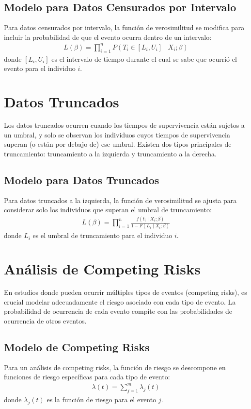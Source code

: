 \documentclass[a4paper]{report} %
\begin{document}
\subsection{Modelo para Datos Censurados por Intervalo}
Para datos censurados por intervalo, la funci\'on de verosimilitud se modifica para incluir la probabilidad de que el evento ocurra dentro de un intervalo:
\begin{eqnarray*}
L(\beta) = \prod_{i=1}^n P(T_i \in [L_i, U_i] \mid X_i; \beta)
\end{eqnarray*}
donde $[L_i, U_i]$ es el intervalo de tiempo durante el cual se sabe que ocurri\'o el evento para el individuo $i$.

\section{Datos Truncados}
Los datos truncados ocurren cuando los tiempos de supervivencia est\'an sujetos a un umbral, y solo se observan los individuos cuyos tiempos de supervivencia superan (o est\'an por debajo de) ese umbral. Existen dos tipos principales de truncamiento: truncamiento a la izquierda y truncamiento a la derecha.

\subsection{Modelo para Datos Truncados}
Para datos truncados a la izquierda, la funci\'on de verosimilitud se ajusta para considerar solo los individuos que superan el umbral de truncamiento:
\begin{eqnarray*}
L(\beta) = \prod_{i=1}^n \frac{f(t_i \mid X_i; \beta)}{1 - F(L_i \mid X_i; \beta)}
\end{eqnarray*}
donde $L_i$ es el umbral de truncamiento para el individuo $i$.

\section{An\'alisis de Competing Risks}
En estudios donde pueden ocurrir m\'ultiples tipos de eventos (competing risks), es crucial modelar adecuadamente el riesgo asociado con cada tipo de evento. La probabilidad de ocurrencia de cada evento compite con las probabilidades de ocurrencia de otros eventos.

\subsection{Modelo de Competing Risks}
Para un an\'alisis de competing risks, la funci\'on de riesgo se descompone en funciones de riesgo espec\'ificas para cada tipo de evento:
\begin{eqnarray*}
\lambda(t) = \sum_{j=1}^m \lambda_j(t)
\end{eqnarray*}
donde $\lambda_j(t)$ es la funci\'on de riesgo para el evento $j$.
\end{document}

